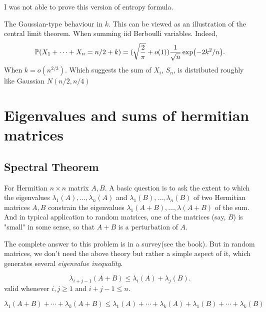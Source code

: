 I was not able to prove this version of entropy formula. 

\begin{remark}    
    The Gaussian-type behaviour in $k$. This can be viewed as an illustration of the central limit theorem.
    When summing iid Berboulli variables. Indeed,
    \begin{equation*}
        \mathbb{P}(X_1+\cdots+X_n=n/2+k)=(\sqrt{\frac{2}{\pi }} +o(1))\frac{1}{\sqrt{n} }\exp(-2k^2/n).
    \end{equation*}
    When $k=o(n^{2/3})$. Which suggests the sum of $X_i$, $S_n$, is distributed roughly like Gaussian $N(n/2,n/4)$
\end{remark}
    
\section{Eigenvalues and sums of hermitian matrices}

\subsection{Spectral Theorem}

For Hermitian $n\times n$ matrix $A,B$. 
A basic question is to ask the extent to which the eigenvalues $\lambda_1(A),\dots,\lambda_n(A)$ and $\lambda_1(B),\dots,\lambda_n(B)$ of two Hermitian matrices $A,B$ constrain the eigenvalues $\lambda_1(A+B),\dots,\lambda(A+B)$ of the sum. 
And in typical application to random matrices, one of the matrices (say, $B$) is "small" in some sense, so that $A+B$ is a perturbation of $A$.

The complete answer to this problem is in a survey(see the book). But in random matrices, we don't need the above theory but rather a simple aspect of it, which generates several \textit{eigenvalue inequality}.

\begin{proposition}
    \label{Weyl inequality}
    \begin{equation}
        \lambda_{i+j-1}(A+B)\leq \lambda_i(A)+\lambda_j(B). 
    \end{equation}
    valid whenever $i,j\geq 1$ and $i+j-1\leq n$.
\end{proposition}

\begin{proposition}
    \label{Ky Fan inequality}
    \begin{equation}
        \lambda_1(A+B)+\cdots+\lambda_k(A+B)\leq \lambda_1(A)+\cdots+\lambda_k(A)+\lambda_1(B)+\cdots+\lambda_k(B)
    \end{equation}
\end{proposition}

